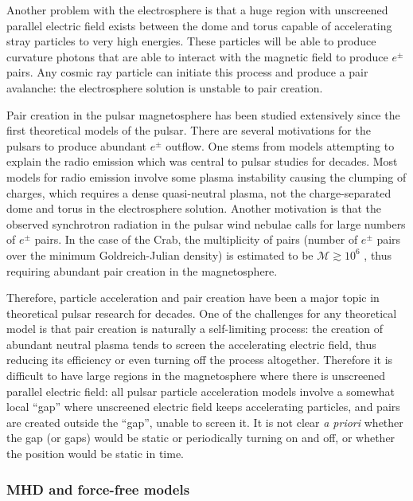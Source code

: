 Another problem with the electrosphere is that a huge region with unscreened
parallel electric field exists between the dome and torus capable of
accelerating stray particles to very high energies. These particles will be able
to produce curvature photons that are able to interact with the magnetic field
to produce $e^{\pm}$ pairs. Any cosmic ray particle can initiate this process
and produce a pair avalanche: the electrosphere solution is
unstable to pair creation.

Pair creation in the pulsar magnetosphere has been studied extensively since the
first theoretical models of the pulsar. There are several motivations for the
pulsars to produce abundant $e^{\pm}$ outflow. One stems from models attempting
to explain the radio emission which was central to pulsar studies for decades.
Most models for radio emission involve some plasma instability causing the
clumping of charges, which requires a dense quasi-neutral plasma, not the
charge-separated dome and torus in the electrosphere solution. Another
motivation is that the observed synchrotron radiation in the pulsar wind nebulae
calls for large numbers of $e^{\pm}$ pairs. In the case of the Crab, the
multiplicity of pairs (number of $e^{\pm}$ pairs over the minimum
Goldreich-Julian density) is estimated to be $\mathcal{M} \gtrsim 10^{6}$
\citep{de_jager_gamma-ray_1996}, thus requiring abundant pair creation in
the magnetosphere.

Therefore, particle acceleration and pair creation have been a major topic in
theoretical pulsar research for decades. One of the challenges for any
theoretical model is that pair creation is naturally a self-limiting process:
the creation of abundant neutral plasma tends to screen the accelerating electric
field, thus reducing its efficiency or even turning off the process altogether.
Therefore it is difficult to have large regions in the magnetosphere where there
is unscreened parallel electric field: all pulsar particle acceleration models
involve a somewhat local ``gap'' where unscreened electric field keeps
accelerating particles, and pairs are created outside the ``gap'', unable to
screen it. It is not clear {\it a priori} whether the gap (or gaps) would be
static or periodically turning on and off, or whether the position would be
static in time.

\subsubsection{MHD and force-free models}
\label{sec:mhd-force-free}

